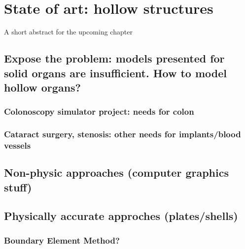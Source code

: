 \chapter{State of art: hollow structures}
\label{chap7}
\begin{shortAbstract}
A short abstract for the upcoming chapter
\end{shortAbstract}


\section{Expose the problem: models presented for solid organs are insufficient. How to model hollow organs?}
	\subsection{Colonoscopy simulator project: needs for colon}
	\subsection{Cataract surgery, stenosis: other needs for implants/blood vessels}
		
\section{Non-physic approaches (computer graphics stuff)}
		
\section{Physically accurate approches (plates/shells)}

	\subsection{Boundary Element Method?}